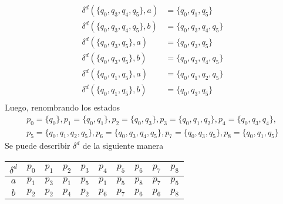 \documentclass{article}
\begin{document}
\begin{enumerate}
{\begin{itemize}
\begin{enumerate}
{\begin{align*}
                            \delta^{d}(\{q_{0}, q_{3}, q_{4}, q_{5}\}, a) &= \{q_{0}, q_{1}, q_{5}\}  \\
                            \delta^{d}(\{q_{0}, q_{3}, q_{4}, q_{5}\}, b) &= \{q_{0}, q_{3}, q_{4}, q_{5}\} \\
                            \delta^{d}(\{q_{0}, q_{3}, q_{5}\}, a) &= \{q_{0}, q_{3}, q_{5}\}\\
                            \delta^{d}(\{q_{0}, q_{3}, q_{5}\}, b) &= \{q_{0}, q_{3}, q_{4}, q_{5}\} \\
                            \delta^{d}(\{q_{0}, q_{1}, q_{5}\}, a) &= \{q_{0}, q_{1}, q_{2}, q_{5}\}\\
                            \delta^{d}(\{q_{0}, q_{1}, q_{5}\}, b) &= \{q_{0}, q_{3}, q_{5}\} \\
                        \end{align*}
                        Luego, renombrando los estados
                        \begin{align*}
                            p_0 = \{q_{0}\}, p_1 = \{q_{0}, q_{1}\}, 
                            p_2 = \{q_{0}, q_{3}\}, p_3 = \{q_{0}, q_{1}, q_{2}\},
                            p_4 = \{q_{0}, q_{3}, q_{4}\}, \\
                            p_5 = \{q_{0}, q_{1}, q_{2}, q_{5}\},
                            p_6 = \{q_{0}, q_{3}, q_{4}, q_{5}\},
                            p_7 = \{q_{0}, q_{3}, q_{5}\},
                            p_8 = \{q_{0}, q_{1}, q_{5}\}
                        \end{align*}
                        Se puede describir $\delta^{d}$ de la siguiente manera

                        \begin{table}[H]
                            \centering
                            \begin{tabular}{|c|c|c|c|c|c|c|c|c|c|}
                            \hline
                            $\delta^{d}$ & $p_0$ & $p_1$ & $p_2$ & $p_3$ & $p_4$ & $p_5$ & $p_6$ & $p_7$ & $p_8$ \\ \hline
                            $a$          & $p_1$ & $p_3$ & $p_1$ & $p_5$ & $p_1$ & $p_5$ & $p_8$ & $p_7$ & $p_5$ \\ \hline
                            $b$          & $p_2$ & $p_2$ & $p_4$ & $p_2$ & $p_6$ & $p_7$ & $p_6$ & $p_6$ & $p_8$ \\ \hline
                            \end{tabular}
                        \end{table}
                    
}
\end{enumerate}
\end{itemize}}
\end{enumerate}
\end{document}
